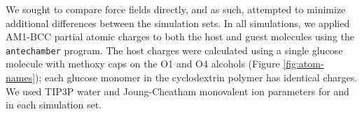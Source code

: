 \documentclass[9pt,lineno]{elife}
\begin{document}

We sought to compare force fields directly, and as such, attempted to minimize additional differences between the simulation sets.
In all simulations, we applied AM1-BCC \cite{jakalian_fast_2000, jakalian_fast_2002} partial atomic charges to both the host and guest molecules using the \texttt{antechamber} program.
The host charges were calculated using a single glucose molecule with methoxy caps on the O1 and O4 alcohols (Figure \ref{fig:atom-names}); each glucose monomer in the cyclodextrin polymer has identical charges.
We used TIP3P water \cite{jorgensen_comparison_1983} and Joung-Cheatham monovalent ion parameters for  and  \cite{joung_determination_2008} in each simulation set.
\end{document}
